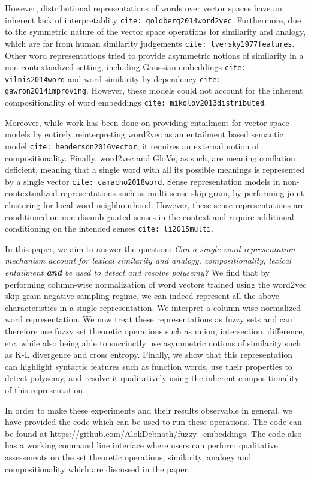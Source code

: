 \documentclass[11pt]{book}
\newcommand{\citep}[1]{\texttt{cite: #1}}
\begin{document}
However, distributional representations of words over vector spaces have an
inherent lack of interpretablity \citep{goldberg2014word2vec}. Furthermore, due
to the symmetric nature of the vector space operations for similarity and
analogy, which are far from human similarity judgements
\citep{tversky1977features}. Other word representations tried to provide
asymmetric notions of similarity in a non-contextualized setting, including
Gaussian embeddings \citep{vilnis2014word} and word similarity by dependency
\citep{gawron2014improving}. However, these models could not account for the
inherent compositionality of word embeddings \citep{mikolov2013distributed}. 

Moreover, while work has been done on providing entailment for vector space
models by entirely reinterpreting word2vec as an entailment based semantic
model \citep{henderson2016vector}, it requires an external notion of
compositionality. Finally, word2vec and GloVe, as such, are meaning conflation
deficient, meaning that a single word with all its possible meanings is
represented by a single vector \citep{camacho2018word}. Sense representation
models in non-contextualized representations such as multi-sense skip gram, by
performing joint clustering for local word neighbourhood. However, these sense
representations are conditioned on non-disambiguated senses in the context and
require additional conditioning on the intended senses \citep{li2015multi}. 

In this paper, we aim to answer the question: \textit{Can a single word
representation mechanism account for lexical similarity and analogy,
compositionality, lexical entailment \textbf{and} be used to detect and resolve
polysemy?} We find that by performing column-wise normalization of word vectors
trained using the word2vec skip-gram negative sampling regime, we can indeed
represent all the above characteristics in a single representation. We
interpret a column wise normalized word representation. We now treat these
representations as fuzzy sets and can therefore use fuzzy set theoretic
operations such as union, intersection, difference, etc. while also being able
to succinctly use asymmetric notions of similarity such as K-L divergence and
cross entropy. Finally, we show that this representation can highlight
syntactic features such as function words, use their properties to detect
polysemy, and resolve it qualitatively using the inherent compositionality of
this representation.

In order to make these experiments and their results observable in general, we
have provided the code which can be used to run these operations. The code can
be found at \url{https://github.com/AlokDebnath/fuzzy_embeddings}. The code
also has a working command line interface where users can perform qualitative
assessments on the set theoretic operations, similarity, analogy and
compositionality which are discussed in the paper.
\end{document}
